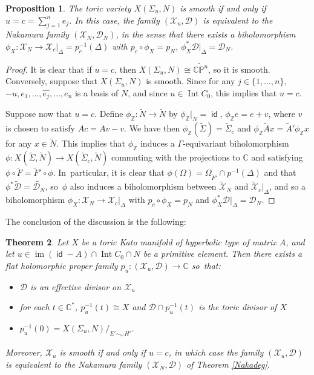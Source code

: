 \documentclass[JEP,XML,SOM,Unicode,NoFloatCountersInSection]{cedram}
\let\mathcal\mathscr
\newtheorem{theorem}{Theorem}[section]
\newtheorem{proposition}[theorem]{Proposition}
\theoremstyle{definition}
\let\wt\widetilde
\newcommand{\CC}{\mathbb{C}}
\newcommand{\PP}{\mathbb{P}}
\newcommand{\ZZ}{\mathbb{Z}}
\DeclareMathOperator{\id}{\mathsf{id}}
\DeclareMathOperator{\im}{im}
\DeclareMathOperator{\Int}{Int}
\begin{document}
\begin{proposition}
The toric variety $X(\Sigma_u,N)$ is smooth if and only if $u=c=\sum_{j=1}^ne_j$. In this case, the family $(\mathcal{X}_u,\mathcal D)$ is equivalent to the Nakamura family $(\mathcal X_N,\mathcal D_N)$, in the sense that there exists a biholomorphism $\phi_X:\mathcal{X}_N\to\mathcal{X}_c|_\Delta=p_c^{-1}(\Delta)$ with $p_c\circ\phi_X=p_N$, $\phi_X^*\mathcal D|_\Delta=\mathcal D_N$.
\end{proposition}

\begin{proof}
It is clear that if $u=c$, then $X(\Sigma_u,N)\cong \widetilde{\CC\PP^n}$, so it is smooth. Conversely, suppose that $X(\Sigma_u,N)$ is smooth. Since for any $j\in\{1,\ldots, n\}$, $-u,e_1,\ldots, \widehat{e_j}, \ldots, e_n$ is a basis of $N$, and since $u\in\Int C_0$, this implies that $u=c$.

Suppose now that $u=c$. Define $\phi_\ZZ:\wt{N}\to \wt{N}$ by $\phi_\ZZ|_N=\id$, $\phi_\ZZ e=e+v$, where $v$ is chosen to satisfy $Ac=Av-v$. We have then $\phi_\ZZ(\wt{\Sigma})=\wt{\Sigma}_c$ and $\phi_\ZZ \wt{A} x=\wt{A}'\phi_\ZZ x$ for any $x\in \wt{N}$. This implies that $\phi_\ZZ$ induces a $\Gamma$-equivariant biholomorphism $\phi:X(\wt{\Sigma},\wt{N})\to X(\wt{\Sigma}_c,\wt{N})$ commuting with the projections to $\CC$ and satisfying $\phi\circ \wt{F}=\wt{F}'\circ\phi$. In~par\-ti\-cular, it is clear that $\phi(\Omega)=\Omega_{\wt{F}'}\cap p^{-1}(\Delta)$ and that $\phi^*\wt{\mathcal D}=\wt{\mathcal D_N}$, so~$\phi$ also induces a biholomorphism between $\wt{\mathcal{X}}_N$ and $\wt{\mathcal{X}}_c|_{\Delta}$, and so a biholomorphism $\phi_X:\mathcal{X}_N\to\mathcal{X}_c|_\Delta$ with $p_c\circ\phi_X=p_N$ and $\phi_X^*\mathcal D|_\Delta=\mathcal D_N$.
\end{proof}

The conclusion of the discussion is the following:
\begin{theorem}\label{Tsudeg}
Let $X$ be a toric Kato manifold of hyperbolic type of matrix $A$, and let $u\in\im(\id-A)\cap \Int C_0\cap N$ be a primitive element. Then there exists a flat holomorphic proper family $p_u:(\mathcal{X}_u,\mathcal D)\to\CC$ so~that:
\begin{itemize}
\item $\mathcal D$ is an effective divisor on $\mathcal X_u$
\item for each $t\in\CC^*$, $p_u^{-1}(t)\cong X$ and $\mathcal{D}\cap p_u^{-1}(t)$ is the toric divisor of $X$
\item $p_u^{-1}(0)=X(\Sigma_u,N)/_{E'\sim_{\wt{\gamma}'}H'}$. 
\end{itemize}
Moreover, $\mathcal X_u$ is smooth if and only if $u=c$, in which case the family $(\mathcal X_u,\mathcal D)$ is equivalent to the Nakamura family $(\mathcal X_N,\mathcal D)$ of Theorem \ref{Nakadeg}.
\end{theorem}
\end{document}
